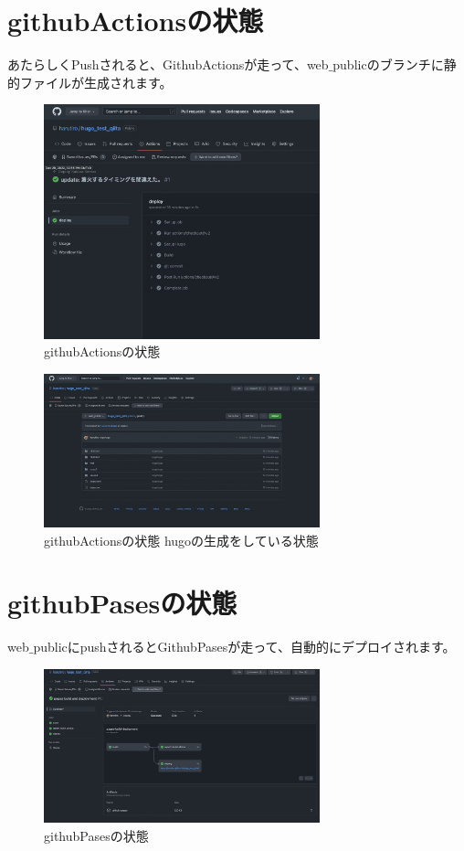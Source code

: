 \section{githubActionsの状態}
  あたらしくPushされると、GithubActionsが走って、web$\_$publicのブランチに静的ファイルが生成されます。

  \begin{figure}[H]
    \centering
    \includegraphics[width=8cm]{./image/02-chap9/git-action1.png}
    \caption{githubActionsの状態}
    \label{chap9-git-action1-image}
  \end{figure}

  \begin{figure}[H]
    \centering
    \includegraphics[width=8cm]{./image/02-chap9/git-action2.png}
    \caption{githubActionsの状態 hugoの生成をしている状態}
    \label{chap9-git-action2-image}
  \end{figure}

\section{githubPasesの状態}
  web$\_$publicにpushされるとGithubPasesが走って、自動的にデプロイされます。

  \begin{figure}[H]
    \centering
    \includegraphics[width=8cm]{./image/02-chap9/git-pases.png}
    \caption{githubPasesの状態}
    \label{chap9-git-pases-image}
  \end{figure}

